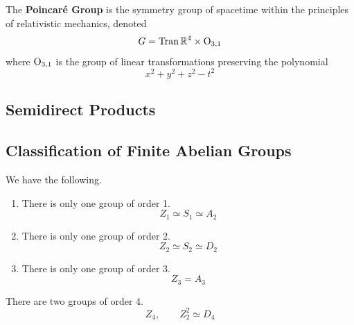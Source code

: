   \begin{example}
    \label{ex:poincare-group}
    The \textbf{Poincaré Group} is the symmetry group of spacetime within the principles of relativistic mechanics, denoted
    \begin{equation}
      G = \operatorname{Tran} \mathbb{R}^{4} \times \operatorname{O}_{3,1}
    \end{equation}
    where $\operatorname{O}_{3,1}$ is the group of linear transformations preserving the polynomial 
    \begin{equation}
      x^{2} + y^{2} + z^{2} - t^{2}
    \end{equation}
  \end{example} 

\subsection{Semidirect Products} 

\subsection{Classification of Finite Abelian Groups} 

  \begin{theorem}
    \label{thm:groups-of-order-1-2-3}
    We have the following. 
    \begin{enumerate}
      \item There is only one group of order 1. 
        \begin{equation}
          Z_1 \simeq S_1 \simeq A_2
        \end{equation}

      \item There is only one group of order 2. 
        \begin{equation}
          Z_2 \simeq S_2 \simeq D_2
        \end{equation}

      \item There is only one group of order 3. 
        \begin{equation}
          Z_3 = A_3
        \end{equation}
    \end{enumerate}
  \end{theorem}

  \begin{theorem}
    \label{thm:groups-of-order-4}
    There are two groups of order 4. 
    \begin{equation}
      Z_4, \qquad Z_2^2 \simeq D_4
    \end{equation}
  \end{theorem}

